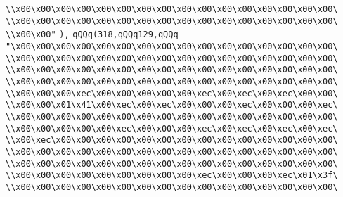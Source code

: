 \verb|\\x00\x00\x00\x00\x00\x00\x00\x00\x00\x00\x00\x00\x00\x00\x00\x00\|\newline
\verb|\\x00\x00\x00\x00\x00\x00\x00\x00\x00\x00\x00\x00\x00\x00\x00\x00\|\newline
\verb|\\x00\x00"|\newline
\verb|),|\newline
\verb|qQQq(318,qQQq129,qQQq|\newline
\verb|"\x00\x00\x00\x00\x00\x00\x00\x00\x00\x00\x00\x00\x00\x00\x00\x00\|\newline
\verb|\\x00\x00\x00\x00\x00\x00\x00\x00\x00\x00\x00\x00\x00\x00\x00\x00\|\newline
\verb|\\x00\x00\x00\x00\x00\x00\x00\x00\x00\x00\x00\x00\x00\x00\x00\x00\|\newline
\verb|\\x00\x00\x00\x00\x00\x00\x00\x00\x00\x00\x00\x00\x00\x00\x00\x00\|\newline
\verb|\\x00\x00\x00\xec\x00\x00\x00\x00\x00\xec\x00\xec\x00\xec\x00\x00\|\newline
\verb|\\x00\x00\x01\x41\x00\xec\x00\xec\x00\x00\x00\xec\x00\x00\x00\xec\|\newline
\verb|\\x00\x00\x00\x00\x00\x00\x00\x00\x00\x00\x00\x00\x00\x00\x00\x00\|\newline
\verb|\\x00\x00\x00\x00\x00\xec\x00\x00\x00\xec\x00\xec\x00\xec\x00\xec\|\newline
\verb|\\x00\xec\x00\x00\x00\x00\x00\x00\x00\x00\x00\x00\x00\x00\x00\x00\|\newline
\verb|\\x00\x00\x00\x00\x00\x00\x00\x00\x00\x00\x00\x00\x00\x00\x00\x00\|\newline
\verb|\\x00\x00\x00\x00\x00\x00\x00\x00\x00\x00\x00\x00\x00\x00\x00\x00\|\newline
\verb|\\x00\x00\x00\x00\x00\x00\x00\x00\x00\xec\x00\x00\x00\xec\x01\x3f\|\newline
\verb|\\x00\x00\x00\x00\x00\x00\x00\x00\x00\x00\x00\x00\x00\x00\x00\x00\|\newline
